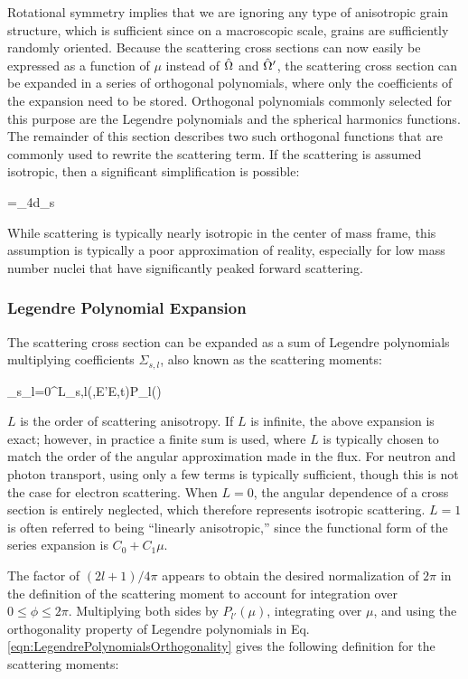 Rotational symmetry implies that we are ignoring any type of anisotropic grain structure, which is sufficient since on a macroscopic scale, grains are sufficiently randomly oriented. Because the scattering cross sections can now easily be expressed as a function of \(\mu\) instead of \(\hat{\Omega}\) and \(\hat{\Omega}'\), the scattering cross section can be expanded in a series of orthogonal polynomials, where only the coefficients of the expansion need to be stored. Orthogonal polynomials commonly selected for this purpose are the Legendre polynomials and the spherical harmonics functions. The remainder of this section describes two such orthogonal functions that are commonly used to rewrite the scattering term. If the scattering is assumed isotropic, then a significant simplification is possible:

\beq
{}=\int_{4\pi}d\hO\Sigma_s\seatout
\eeq

While scattering is typically nearly isotropic in the center of mass frame, this assumption is typically a poor approximation of reality, especially for low mass number nuclei that have significantly peaked forward scattering.

\subsubsection{Legendre Polynomial Expansion}
\label{sec:LegendrePolynomialExpansion}

The scattering cross section can be expanded as a sum of Legendre polynomials multiplying coefficients \(\Sigma_{s,l}\), also known as the scattering moments:

\beq
\label{eq:ScatteringLegendre}
\Sigma_s\seatout \equiv\sum_{l=0}^L\Sigma_{s,l}(,E'\rightarrow E,t)P_l(\mu)
\eeq

\(L\) is the order of scattering anisotropy. If \(L\) is infinite, the above expansion is exact; however, in practice a finite sum is used, where \(L\) is typically chosen to match the order of the angular approximation made in the flux. For neutron and photon transport, using only a few terms is typically sufficient, though this is not the case for electron scattering. When \(L=0\), the angular dependence of a cross section is entirely neglected, which therefore represents isotropic scattering. \(L=1\) is often referred to being ``linearly anisotropic,'' since the functional form of the series expansion is \(C_0+C_1\mu\).

The factor of \((2l+1)/4\pi\) appears to obtain the desired normalization of \(2\pi\) in the definition of the scattering moment to account for integration over \(0\leq\phi\leq2\pi\). Multiplying both sides by \(P_{l'}(\mu)\), integrating over \(\mu\), and using the orthogonality property of Legendre polynomials in Eq. \eqref{eqn:LegendrePolynomialsOrthogonality} gives the following definition for the scattering moments:


